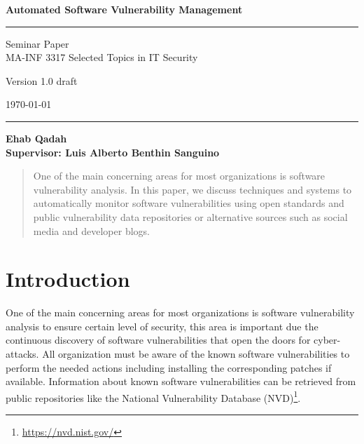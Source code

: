\documentclass{llncs}
\begin{document}
\begin{flushleft}
 
 \thispagestyle{empty}
\centering\LARGE {\bf Automated Software Vulnerability Management}


\rule{\textwidth}{1pt}

\vspace{2pt}


\centering
 Seminar Paper  
 \\MA-INF 3317 Selected Topics in IT Security

{\Large Version 1.0 draft }

\vspace{8pt}
\today

\rule{\textwidth}{1pt}

\vspace{8 cm}

\centering
 \bf Ehab Qadah\\
 
 \vspace{7 pt}
\bf Supervisor: Luis Alberto Benthin Sanguino

\end{flushleft}


\newpage

\tableofcontents

\newpage


\begin{abstract}
One of the main concerning areas for most organizations is software vulnerability analysis. In this paper, we discuss techniques and systems to automatically monitor software vulnerabilities using open standards and public vulnerability data repositories or alternative sources such as social media and developer blogs. 
\end{abstract}

\section{Introduction}

\par One of the main concerning areas for most organizations is software vulnerability analysis to ensure certain level of security,  this area is important due the continuous discovery of software vulnerabilities that open the doors for cyber-attacks. All organization must be aware of the known software vulnerabilities to perform the needed actions including installing the corresponding patches if available. Information about known software vulnerabilities can be retrieved from public repositories like the National Vulnerability Database (NVD)\footnote{\url{https://nvd.nist.gov/}}.
 
\end{document}
